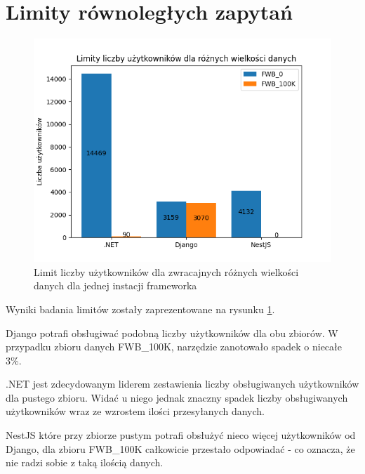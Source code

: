 \section{Limity równoległych zapytań}

\begin{figure}[!hb]
	\centering \includegraphics[width=1\linewidth]{rysunki/Limit_vus_for_different_datasets.png}
	\caption{Limit liczby użytkowników dla zwracajnych różnych wielkości danych dla jednej instacji frameworka}
	\label{rys:limit_vus}
\end{figure}

Wyniki badania limitów zostały zaprezentowane na rysunku \ref{rys:limit_vus}.

Django potrafi obsługiwać podobną liczby użytkowników dla obu zbiorów.
W przypadku zbioru danych FWB\_100K, narzędzie zanotowało spadek o niecałe 3\%.

.NET jest zdecydowanym liderem zestawienia liczby obsługiwanych użytkowników dla pustego zbioru. 
Widać u niego jednak znaczny spadek liczby obsługiwanych użytkowników wraz ze wzrostem ilości przesyłanych danych.

NestJS które przy zbiorze pustym potrafi obsłużyć nieco więcej użytkowników od Django, dla zbioru FWB\_100K całkowicie przestało odpowiadać - co oznacza, że nie radzi sobie z taką ilością danych.


